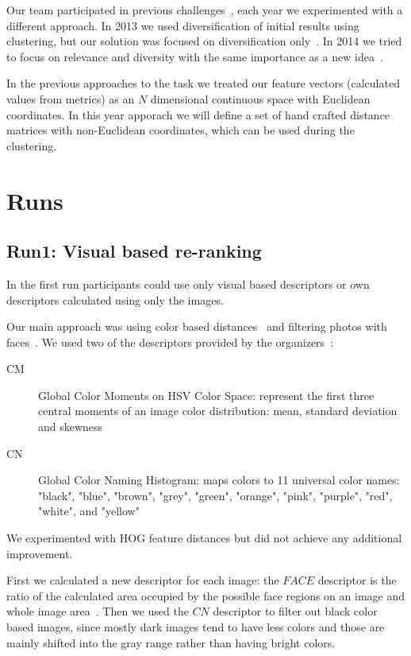 \documentclass{acm_proc_article-me}
\begin{document}
Our team participated in previous challenges~\cite{szHucs2013bmemtm,Paroczi2014}, each year we experimented with a different approach. In 2013 we used diversification of initial results using clustering, but our solution was focused on diversification only~\cite{szHucs2013bmemtm}. In 2014 we tried to focus on relevance and diversity with the same importance as a new idea~\cite{Paroczi2014}.

In the previous approaches to the task we treated our feature vectors (calculated values from metrics) as an $N$ dimensional continuous space with Euclidean coordinates. In this year apporach we will define a set of hand crafted distance matrices with non-Euclidean coordinates, which can be used during the clustering. 

\section{Runs}

\subsection{Run1: Visual based re-ranking}\label{run1}
In the first run participants could use only visual based descriptors or own descriptors calculated using only the images.

Our main approach was using color based distances~\cite{Datta2008,Paramita2010} and filtering photos with faces~\cite{szHucs2013bmemtm,Paroczi2014}. We used two of the descriptors provided by the organizers~\cite{Task2015}:
\begin{description}
	\item[CM] Global Color Moments on HSV Color Space: represent the first three central moments of an image color distribution: mean, standard deviation and skewness
	\item [CN] Global Color Naming Histogram: maps colors to 11 universal color names: "black", "blue", "brown", "grey", "green", "orange", "pink", "purple", "red", "white", and "yellow"
\end{description}

We experimented with HOG feature distances but did not achieve any additional improvement.

First we calculated a new descriptor for each image: the $FACE$ descriptor is the ratio of the calculated area occupied by the possible face regions on an image and whole
image area~\cite{szHucs2013bmemtm}. Then we used the $CN$ descriptor to filter out black color based images, since mostly dark images tend to have less colors and those are mainly shifted into the gray range rather than having bright colors.
\end{document}
